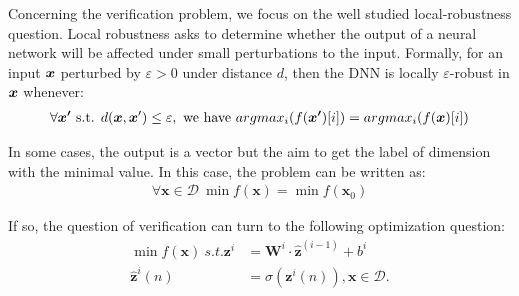 \documentclass{llncs}
\begin{document}
\iffalse
and the $i$-th hidden layer is a vector in $\mathbb{R}^{d_i}$, 
and the output layer is a vector in $\mathbb{R}^{d'}$ or a scale. 
The weights, bias and activation functions decide propagate the from previous to the next layer. In formula, from layer $l_{i-1}$ to layer $l_{i}$, the weight 
$\boldsymbol{W}^i$ is matrix of $d_i\times d_{i-1}$, 
the bias is a vector $\vb^i$ in $\mathbb{R}^{d_i}$, and the activation function 
is $\sigma$, then  if the $i-1$-th layer is $\hat{\boldsymbol{z}}^{(i-1)}$, 
then the value of $i$-th layer is computed by: 
\begin{align*}
	{\boldsymbol{z}}^{i} &= \boldsymbol{W}^i\cdot \hat{\boldsymbol{z}}^{(i-1)}+ \vb^i\\
	\hat{\boldsymbol{z}}^{i}(n) &= \sigma({\boldsymbol{z}}^i(n)).
\end{align*} The vector $\hat{\boldsymbol{z}}$ is called post-activation values, and $\boldsymbol{z}$ is called pre-activation values, and $\boldsymbol{z}^{(i)}_j$ is used to call the $j$-th neuron in the $i$-th layer. In our style, we also call neurons \emph{nodes} and use $a,b,c,d$ to denote them. We use $W_{ab}$ to denote the weight from neuron $b$ to $a$. We use $\boldsymbol{x}$ to denote the vector of input and  $f(\boldsymbol{x})$ to denote the output.
\fi

\medskip

Concerning the verification problem, we focus on the well studied local-robustness question. Local robustness asks to determine whether the output of a neural network will be affected under small perturbations to the input. 
Formally, for an input ${\bm{x}}$ perturbed by $\varepsilon >0$ under distance $d$, then the DNN is locally $\varepsilon$-robust in ${\bm{x}}$ whenever:
\begin{align*}
	\forall \boldsymbol{x'} \text{ s.t. } d({\bm{x}},{\bm{x}}')\leq \varepsilon, \text{ we have }  
	argmax_i (f(\boldsymbol{x'})[i]) = argmax_i(f(\boldsymbol{x})[i])
\end{align*} 

\iffalse
In some cases, the output is a vector but the aim to get the label of dimension with the minimal value. In this case, the problem can be written as:\begin{align*}
	\forall \boldsymbol{x} \in\mathcal{D} \  \min f(\boldsymbol{x}) = \min f(\boldsymbol{x}_0)
\end{align*}

If so, the question of verification can turn to the following optimization question: \begin{align*}
	\min f(\boldsymbol{x}) \ s.t. {\boldsymbol{z}}^{i} &= \boldsymbol{W}^i\cdot \hat{\boldsymbol{z}}^{(i-1)}+ b^i\\
	\hat{\boldsymbol{z}}^{i}(n) &= \sigma({\boldsymbol{z}}^i(n)), \boldsymbol{x}\in\mathcal{D}.
\end{align*}
\end{document}
